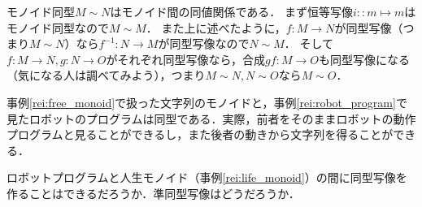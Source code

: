 \documentclass[11pt,a4paper, dvipdfmx]{jsarticle}
\begin{document}
モノイド同型$M \sim N$はモノイド間の同値関係である．
まず恒等写像$i::m \mapsto m$はモノイド同型なので$M \sim M$．
また上に述べたように，$f:M \to N$が同型写像（つまり$M \sim N$）なら$f^{-1}:N \to M$が同型写像なので$N \sim M$．
そして$f:M \to N, g:N \to O$がそれぞれ同型写像なら，合成$gf:M \to O$も同型写像になる（気になる人は調べてみよう），つまり$M \sim N, N \sim O$なら$M \sim O$．

\begin{rei}{}{}
    事例\ref{rei:free_monoid}で扱った文字列のモノイドと，事例\ref{rei:robot_program}で見たロボットのプログラムは同型である．実際，前者をそのままロボットの動作プログラムと見ることができるし，また後者の動きから文字列を得ることができる．
\end{rei}

\begin{renshu}{}{}
    ロボットプログラムと人生モノイド（事例\ref{rei:life_monoid}）の間に同型写像を作ることはできるだろうか．準同型写像はどうだろうか．
\end{renshu}



\end{document}
